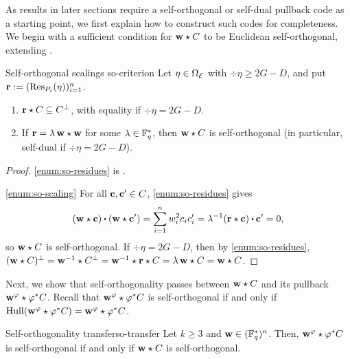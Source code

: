 \documentclass[twocolumn, 11pt]{scrartcl}
\begin{document}
As results in later sections require a self-orthogonal or self-dual pullback code as a starting point, we first explain how to construct such codes for completeness. We begin with a sufficient condition for $\mathbf{w}\star C$ to be Euclidean self-orthogonal, extending \cite[Lem.~3--4]{wang2026generic}.

\begin{lemma}{Self-orthogonal scalings \cite{wang2026generic}}{so-criterion}
    Let $\eta\in\Omega_\mathcal{E}$ with $\div\eta\geq2G-D$, and put $\mathbf{r}:=(\operatorname{Res}_{P_i}(\eta))_{i=1}^n$.
    \begin{enumerate}
        \item \label{enum:so-residues} $\mathbf{r}\star C\subseteq C^\perp$, with equality if $\div\eta=2G-D$.
        \item \label{enum:so-scaling} If $\mathbf{r}=\lambda\,\mathbf{w}\star\mathbf{w}$ for some $\lambda\in\mathbb{F}_q^*$, then $\mathbf{w}\star C$ is self-orthogonal (in particular, self-dual if $\div\eta=2G-D$).
    \end{enumerate}
\end{lemma}

\begin{proof}
    \ref{enum:so-residues} is \cite[Lem.~3--4]{wang2026generic}.

    \ref{enum:so-scaling} For all $\mathbf{c},\mathbf{c}'\in C$, \ref{enum:so-residues} gives
    \[ (\bfw\star\bfc)\dotpr(\bfw\star\bfc')=\sum_{i=1}^nw_i^2c_ic'_i=\lambda^{-1}(\bfr\star\bfc)\dotpr\bfc'=0, \]
    so $\mathbf{w}\star C$ is self-orthogonal. If $\div\eta=2G-D$, then by \ref{enum:so-residues}, $(\mathbf{w}\star C)^\perp=\mathbf{w}^{-1}\star C^\perp=\mathbf{w}^{-1}\star\mathbf{r}\star C=\lambda\,\mathbf{w}\star C=\mathbf{w}\star C$.
\end{proof}

Next, we show that self-orthogonality passes between $\mathbf{w}\star C$ and its pullback $\mathbf{w}^\varphi\star\varphi^*C$. Recall that $\mathbf{w}^\varphi\star\varphi^*C$ is self-orthogonal if and only if $\operatorname{Hull}(\mathbf{w}^\varphi\star\varphi^*C)=\mathbf{w}^\varphi\star\varphi^*C$.

\begin{theorem}{Self-orthogonality transfer}{so-transfer}
    Let $k\geq3$ and $\mathbf{w}\in(\mathbb{F}_q^*)^n$. Then, $\mathbf{w}^\varphi\star \varphi^*C$ is self-orthogonal if and only if $\mathbf{w}\star C$ is self-orthogonal.
\end{theorem}
\end{document}
